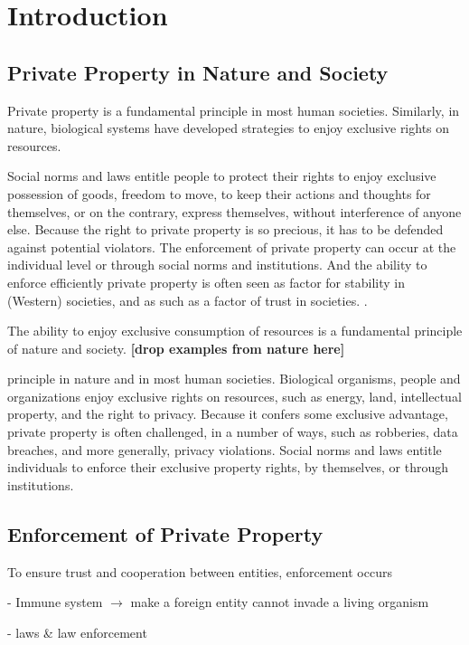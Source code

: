 \section*{Introduction}
\subsection*{Private Property in Nature and Society}

Private property is a fundamental principle in most human societies. Similarly, in nature, biological systems have developed strategies to enjoy exclusive rights on resources.



Social norms and laws  entitle people to protect their rights to enjoy exclusive possession of goods, freedom to move, to keep their actions and thoughts for themselves, or on the contrary, express themselves, without interference of anyone else. Because the right to private property is so precious, it has to be defended against potential violators. The enforcement of private property can occur at the individual level or through social norms and institutions. And the ability to enforce efficiently private property is often seen as factor for stability in (Western) societies, and as such as a factor of trust in societies. \cite{}. 



The ability to enjoy exclusive consumption of resources is a fundamental principle of nature and society. {\bf [drop examples from nature here]}


 principle in nature and in most human societies. Biological organisms, people and organizations enjoy exclusive rights on resources, such as energy, land, intellectual property, and the right to privacy. Because it confers some exclusive advantage, private property is often challenged, in a number of ways, such as robberies, data breaches, and more generally, privacy violations. Social norms and laws entitle individuals to enforce their exclusive property rights, by themselves, or through institutions.


\subsection*{Enforcement of Private Property}
To ensure trust and cooperation between entities, enforcement occurs

- Immune system $\rightarrow$ make a foreign entity cannot invade a living organism

- laws \& law enforcement 



